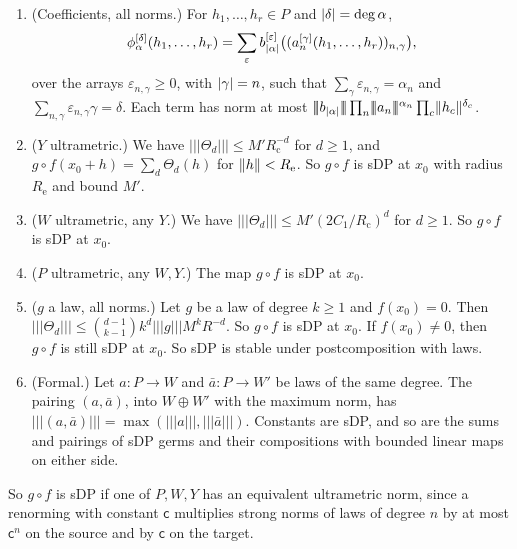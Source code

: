 \begin{theorem}[composition]\label{dp:thm:strong-composition}
\leavevmode
\begin{enumerate}
\item \textup{(Coefficients, all norms.)} For $h_1,\dots,h_r\in P$ and $\lvert \delta\rvert=\deg\alpha$,
\begin{equation}\label{dp:s:eq:composite-coefficient}
 \phi_\alpha^{[\delta]}(h_1,\dots,h_r)=\sum_\varepsilon b_{\lvert \alpha\rvert}^{[\varepsilon]}\bigl((a_n^{[\gamma]}(h_1,\dots,h_r))_{n,\gamma}\bigr),
\end{equation}
over the arrays $\varepsilon_{n,\gamma}\ge0$, with $\lvert \gamma\rvert=n$, such that $\sum_\gamma\varepsilon_{n,\gamma}=\alpha_n$ and $\sum_{n,\gamma}\varepsilon_{n,\gamma}\gamma=\delta$. Each term has norm at most $\lvert\!\lvert\!\lvert b_{\abs\alpha}\rvert\!\rvert\!\rvert\prod_n\lvert\!\lvert\!\lvert a_n\rvert\!\rvert\!\rvert^{\alpha_n}\prod_c\norm{h_c}^{\delta_c}$.
\item \textup{($Y$ ultrametric.)} We have $\lvert\!\lvert\!\lvert \Theta_d\rvert\!\rvert\!\rvert\le M'R_{\mathrm c}^{-d}$ for $d\ge1$, and $g\circ f(x_0+h)=\sum_d\Theta_d(h)$ for $\lVert h\rVert<R_{\mathrm e}$. So $g\circ f$ is sDP at $x_0$ with radius $R_{\mathrm e}$ and bound $M'$.
\item \textup{($W$ ultrametric, any $Y$.)} We have $\lvert\!\lvert\!\lvert \Theta_d\rvert\!\rvert\!\rvert\le M'(2C_1/R_{\mathrm c})^d$ for $d\ge1$. So $g\circ f$ is sDP at $x_0$.
\item \textup{($P$ ultrametric, any $W,Y$.)} The map $g\circ f$ is sDP at $x_0$.
\item \textup{($g$ a law, all norms.)} Let $g$ be a law of degree $k\ge1$ and $f(x_0)=0$. Then $\lvert\!\lvert\!\lvert \Theta_d\rvert\!\rvert\!\rvert\le\binom{d-1}{k-1}k^d\lvert\!\lvert\!\lvert g\rvert\!\rvert\!\rvert M^kR^{-d}$. So $g\circ f$ is sDP at $x_0$. If $f(x_0)\ne0$, then $g\circ f$ is still sDP at $x_0$. So sDP is stable under postcomposition with laws.
\item \textup{(Formal.)} Let $a\colon P\to W$ and $\bar a\colon P\to W'$ be laws of the same degree. The pairing $(a,\bar a)$, into $W\oplus W'$ with the maximum norm, has $\lvert\!\lvert\!\lvert (a,\bar a)\rvert\!\rvert\!\rvert=\max(\lvert\!\lvert\!\lvert a\rvert\!\rvert\!\rvert,\lvert\!\lvert\!\lvert \bar a\rvert\!\rvert\!\rvert)$. Constants are sDP, and so are the sums and pairings of sDP germs and their compositions with bounded linear maps on either side.
\end{enumerate}
So $g\circ f$ is sDP if one of $P,W,Y$ has an equivalent ultrametric norm, since a renorming with constant $\mathsf c$ multiplies strong norms of laws of degree $n$ by at most $\mathsf c^n$ on the source and by $\mathsf c$ on the target.
\end{theorem}

